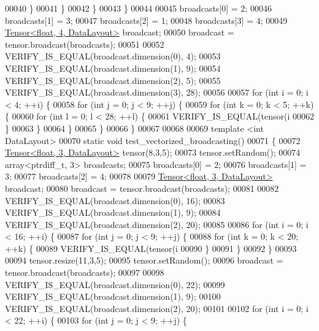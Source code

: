 \begin{DoxyCode}
00040         \}
00041       \}
00042     \}
00043   \}
00044 
00045   broadcasts[0] = 2;
00046   broadcasts[1] = 3;
00047   broadcasts[2] = 1;
00048   broadcasts[3] = 4;
00049   \hyperlink{class_eigen_1_1_tensor}{Tensor<float, 4, DataLayout>} broadcast;
00050   broadcast = tensor.broadcast(broadcasts);
00051 
00052   VERIFY\_IS\_EQUAL(broadcast.dimension(0), 4);
00053   VERIFY\_IS\_EQUAL(broadcast.dimension(1), 9);
00054   VERIFY\_IS\_EQUAL(broadcast.dimension(2), 5);
00055   VERIFY\_IS\_EQUAL(broadcast.dimension(3), 28);
00056 
00057   \textcolor{keywordflow}{for} (\textcolor{keywordtype}{int} i = 0; i < 4; ++i) \{
00058     \textcolor{keywordflow}{for} (\textcolor{keywordtype}{int} j = 0; j < 9; ++j) \{
00059       \textcolor{keywordflow}{for} (\textcolor{keywordtype}{int} k = 0; k < 5; ++k) \{
00060         \textcolor{keywordflow}{for} (\textcolor{keywordtype}{int} l = 0; l < 28; ++l) \{
00061           VERIFY\_IS\_EQUAL(tensor(i%
00062         \}
00063       \}
00064     \}
00065   \}
00066 \}
00067 
00068 
00069 \textcolor{keyword}{template} <\textcolor{keywordtype}{int} DataLayout>
00070 \textcolor{keyword}{static} \textcolor{keywordtype}{void} test\_vectorized\_broadcasting()
00071 \{
00072   \hyperlink{class_eigen_1_1_tensor}{Tensor<float, 3, DataLayout>} tensor(8,3,5);
00073   tensor.setRandom();
00074   array<ptrdiff\_t, 3> broadcasts;
00075   broadcasts[0] = 2;
00076   broadcasts[1] = 3;
00077   broadcasts[2] = 4;
00078 
00079   \hyperlink{class_eigen_1_1_tensor}{Tensor<float, 3, DataLayout>} broadcast;
00080   broadcast = tensor.broadcast(broadcasts);
00081 
00082   VERIFY\_IS\_EQUAL(broadcast.dimension(0), 16);
00083   VERIFY\_IS\_EQUAL(broadcast.dimension(1), 9);
00084   VERIFY\_IS\_EQUAL(broadcast.dimension(2), 20);
00085 
00086   \textcolor{keywordflow}{for} (\textcolor{keywordtype}{int} i = 0; i < 16; ++i) \{
00087     \textcolor{keywordflow}{for} (\textcolor{keywordtype}{int} j = 0; j < 9; ++j) \{
00088       \textcolor{keywordflow}{for} (\textcolor{keywordtype}{int} k = 0; k < 20; ++k) \{
00089         VERIFY\_IS\_EQUAL(tensor(i%
00090       \}
00091     \}
00092   \}
00093 
00094   tensor.resize(11,3,5);
00095   tensor.setRandom();
00096   broadcast = tensor.broadcast(broadcasts);
00097 
00098   VERIFY\_IS\_EQUAL(broadcast.dimension(0), 22);
00099   VERIFY\_IS\_EQUAL(broadcast.dimension(1), 9);
00100   VERIFY\_IS\_EQUAL(broadcast.dimension(2), 20);
00101 
00102   \textcolor{keywordflow}{for} (\textcolor{keywordtype}{int} i = 0; i < 22; ++i) \{
00103     \textcolor{keywordflow}{for} (\textcolor{keywordtype}{int} j = 0; j < 9; ++j) \{

\end{DoxyCode}
